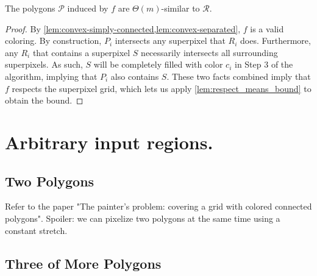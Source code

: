 \documentclass[a4paper,UKenglish,cleveref]{lipics-v2019}
\begin{document}
\begin{theorem}
	The polygons \(\mathcal{P}\) induced by \(f\) are \(\Theta(m)\)-similar to \(\mathcal{R}\).
\end{theorem}
\begin{proof}
	By \cref{lem:convex-simply-connected,lem:convex-separated}, \(f\) is a valid coloring. By construction, \(P_i\) intersects any superpixel that \(R_i\) does. Furthermore, any \(R_i\) that contains a superpixel \(S\) necessarily intersects all surrounding superpixels. As such, \(S\) will be completely filled with color \(c_i\) in Step 3 of the algorithm, implying that \(P_i\) also contains \(S\). These two facts combined imply that \(f\) respects the superpixel grid, which lets us apply \cref{lem:respect_means_bound} to obtain the bound.
\end{proof}



\section{Arbitrary input regions.}
\label{sec:arbitrary}

\subsection{Two Polygons}

Refer to the paper "The painter’s problem: covering a grid with colored connected polygons".
Spoiler: we can pixelize two polygons at the same time using a constant stretch.

\subsection{Three of More Polygons}
\end{document}
